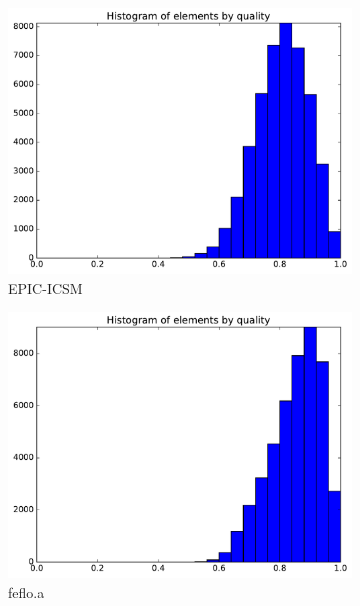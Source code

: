 \documentclass[3p,times,procedia,number]{elsarticle}
\begin{document}
\begin{figure}
\begin{subfigure}{.4\textwidth}
\includegraphics[width=\textwidth]{epic-icsm-cube-linear-quality.pdf}
\caption{EPIC-ICSM}
\end{subfigure}
\begin{subfigure}{.4\textwidth}
\centering
\includegraphics[width=\textwidth]{fefloa-cube-linear-quality.pdf}
\caption{feflo.a}
\end{subfigure}
\begin{subfigure}{.4\textwidth}
\centering

\end{subfigure}
\end{figure}
\end{document}
